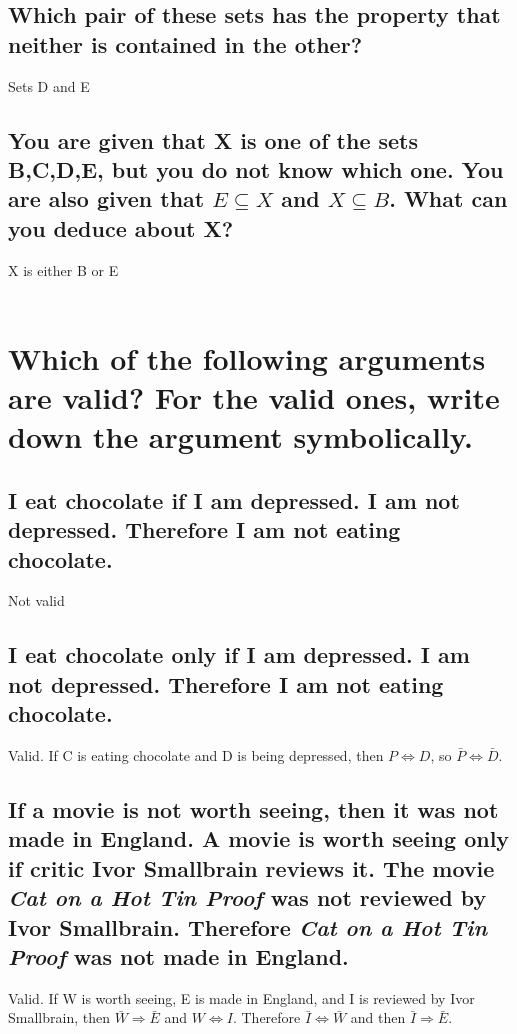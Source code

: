 \documentclass[12pt]{article}
\begin{document}
\subsection{Which pair of these sets has the property that neither is contained in the other?}
Sets D and E
\subsection{
    You are given that X is one of the sets B,C,D,E, but you do not know which one.
    You are also given that $E \subseteq X$ and $X \subseteq B$. What can you deduce about X?
}
X is either B or E\\\\

\section{
    Which of the following arguments are valid?
    For the valid ones, write down the argument symbolically.
}
\subsection{
    I eat chocolate if I am depressed.
    I am not depressed.
    Therefore I am not eating chocolate.
}
Not valid
\subsection{
    I eat chocolate only if I am depressed.
    I am not depressed.
    Therefore I am not eating chocolate.
}
Valid. If C is eating chocolate and D is being depressed, then $P \Leftrightarrow D$, so $\bar{P} \Leftrightarrow \bar{D}$.
\subsection{
    If a movie is not worth seeing, then it was not made in England.
    A movie is worth seeing only if critic Ivor Smallbrain reviews it.
    The movie \emph{Cat on a Hot Tin Proof} was not reviewed by Ivor Smallbrain.
    Therefore \emph{Cat on a Hot Tin Proof} was not made in England.
}
Valid. If W is worth seeing, E is made in England, and I is reviewed by Ivor Smallbrain, 
then $\bar{W} \Rightarrow \bar{E}$ and $W \Leftrightarrow I$.
Therefore $\bar{I} \Leftrightarrow \bar{W}$ and then $\bar{I} \Rightarrow \bar{E}$.
\end{document}
